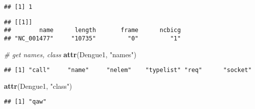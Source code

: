\documentclass[]{article}
\newenvironment{Shaded}{\begin{snugshade}}{\end{snugshade}}
\newcommand{\KeywordTok}[1]{\textcolor[rgb]{0.13,0.29,0.53}{\textbf{#1}}}
\newcommand{\DecValTok}[1]{\textcolor[rgb]{0.00,0.00,0.81}{#1}}
\newcommand{\StringTok}[1]{\textcolor[rgb]{0.31,0.60,0.02}{#1}}
\newcommand{\CommentTok}[1]{\textcolor[rgb]{0.56,0.35,0.01}{\textit{#1}}}
\newcommand{\OperatorTok}[1]{\textcolor[rgb]{0.81,0.36,0.00}{\textbf{#1}}}
\newcommand{\NormalTok}[1]{#1}
\begin{document}
\begin{Shaded}
\end{Shaded}

\begin{verbatim}
## [1] 1
\end{verbatim}

\begin{Shaded}
\end{Shaded}

\begin{verbatim}
## [[1]]
##        name      length       frame      ncbicg 
## "NC_001477"     "10735"         "0"         "1"
\end{verbatim}

\begin{Shaded}
\begin{Highlighting}[]
\CommentTok{# get names, class}
\KeywordTok{attr}\NormalTok{(Dengue1, }\StringTok{"names"}\NormalTok{)}
\end{Highlighting}
\end{Shaded}

\begin{verbatim}
## [1] "call"     "name"     "nelem"    "typelist" "req"      "socket"
\end{verbatim}

\begin{Shaded}
\begin{Highlighting}[]
\KeywordTok{attr}\NormalTok{(Dengue1, }\StringTok{"class"}\NormalTok{)}
\end{Highlighting}
\end{Shaded}

\begin{verbatim}
## [1] "qaw"
\end{verbatim}

\begin{Shaded}
\end{Shaded}
\end{document}
